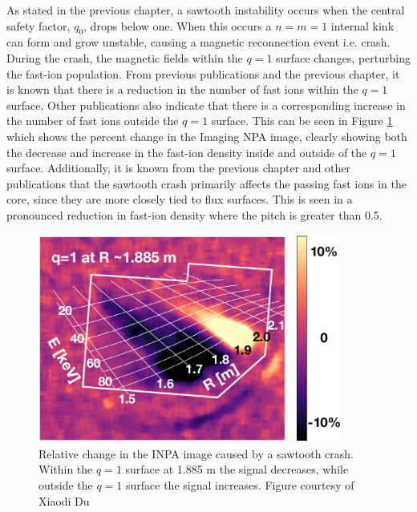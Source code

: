 As stated in the previous chapter, a sawtooth instability occurs when the central safety factor, $q_0$, drops below one. When this occurs a $n=m=1$ internal kink can form and grow unstable, causing a magnetic reconnection event i.e. crash. During the crash, the magnetic fields within the $q=1$ surface changes, perturbing the fast-ion population. From previous publications and the previous chapter, it is known that there is a reduction in the number of fast ions within the $q=1$ surface\cite{jacobsen_stagner2016,van2010imaging,weiland2016}. Other publications also indicate that there is a corresponding increase in the number of fast ions outside the $q=1$ surface.\cite{weiland2016,du2018inpa} This can be seen in Figure \ref{fig:inpa_sawtooth}\cite{du2018inpa} which shows the percent change in the Imaging NPA image, clearly showing both the decrease and increase in the fast-ion density inside and outside of the $q=1$ surface.
Additionally, it is known from the previous chapter and other publications\cite{Muscatello2012,jacobsen_stagner2016,weiland2016} that the sawtooth crash primarily affects the passing fast ions in the core, since they are more closely tied to flux surfaces. This is seen in a pronounced reduction in fast-ion density where the pitch is greater than 0.5.
\begin{figure}[h!]
    \centering
    \includegraphics[width=10cm]{figures/inpa_sawtooth.eps}
    \caption{Relative change in the INPA image caused by a sawtooth crash. Within the $q=1$ surface at 1.885 m the signal decreases, while outside the $q=1$ surface the signal increases. Figure courtesy of Xiaodi Du\cite{du2018inpa}}
    \label{fig:inpa_sawtooth}
\end{figure}

